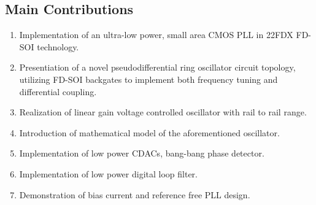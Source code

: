 %

\vspace{1em}

\subsection{Main Contributions}
\vspace{-0.8em}
\begin{enumerate}[itemsep=0pt,label=\protect\mycirc{\arabic*}]
	\setlength\itemsep{-0.8em}
	\item Implementation of an ultra-low power, small area CMOS PLL in 22FDX FD-SOI technology.
	\item Presentiation of a novel pseudodifferential ring oscillator circuit topology, utilizing FD-SOI backgates to implement both frequency tuning and differential coupling.
	\item Realization of linear gain voltage controlled oscillator with rail to rail range. 
	\item Introduction of mathematical model of the aforementioned oscillator.
	\item Implementation of low power CDACs, bang-bang phase detector.
	\item Implementation of low power digital loop filter.
	\item Demonstration of bias current and reference free PLL design.
\end{enumerate}
